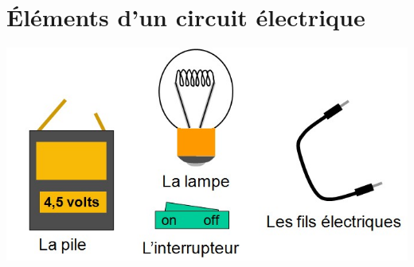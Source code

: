 \documentclass[12pt,a4paper]{article}
\date{}
\title{}
\begin{document}
	
	

\section{\'Eléments d'un circuit électrique}





\begin{center}
	\includegraphics[scale=0.8]{img/dipoles}
\end{center}
\end{document}
